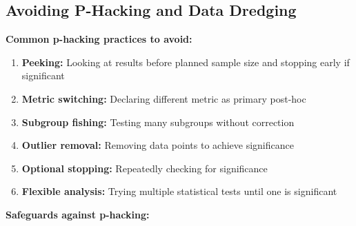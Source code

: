 \subsection{Avoiding P-Hacking and Data Dredging}

\textbf{Common p-hacking practices to avoid:}

\begin{enumerate}
    \item \textbf{Peeking:} Looking at results before planned sample size and stopping early if significant

    \item \textbf{Metric switching:} Declaring different metric as primary post-hoc

    \item \textbf{Subgroup fishing:} Testing many subgroups without correction

    \item \textbf{Outlier removal:} Removing data points to achieve significance

    \item \textbf{Optional stopping:} Repeatedly checking for significance

    \item \textbf{Flexible analysis:} Trying multiple statistical tests until one is significant
\end{enumerate}

\textbf{Safeguards against p-hacking:}

